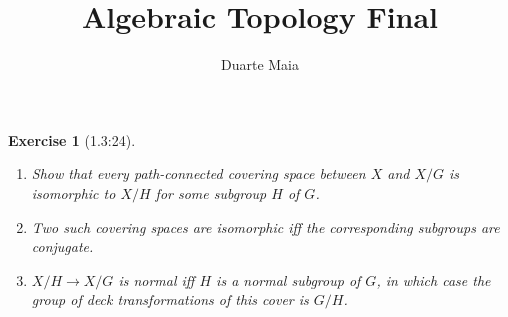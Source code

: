 \documentclass{article}
\title{Algebraic Topology Final}
\author{Duarte Maia}
\theoremstyle{plain}
\newtheorem*{ex}{Exercise}
\theoremstyle{nonumberplain}
\begin{document}
\maketitle

\begin{ex}[1.3:24]
\leavevmode
\begin{enumerate}
\item Show that every path-connected covering space between $X$ and $X/G$ is isomorphic to $X/H$ for some subgroup $H$ of $G$.
\item Two such covering spaces are isomorphic iff the corresponding subgroups are conjugate.
\item $X/H \to X/G$ is normal iff $H$ is a normal subgroup of $G$, in which case the group of deck transformations of this cover is $G/H$.
\end{enumerate}
\end{ex}
\end{document}
